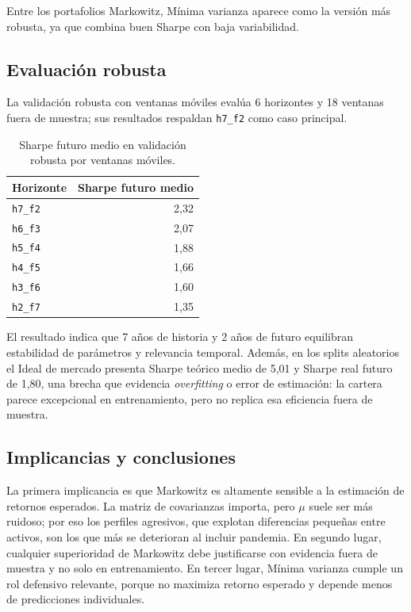 Entre los portafolios Markowitz, M\'inima varianza aparece como la versi\'on m\'as
robusta, ya que combina buen Sharpe con baja variabilidad.

\subsection*{Evaluaci\'on robusta}

La validaci\'on robusta con ventanas m\'oviles eval\'ua 6 horizontes y 18 ventanas
fuera de muestra; sus resultados respaldan \texttt{h7\_f2} como caso principal.

\begin{table}[H]
\centering
\caption{Sharpe futuro medio en validaci\'on robusta por ventanas m\'oviles.}
\label{tab:anexo4_validacion_robusta}
\small
\begin{tabular}{@{}lr@{}}
\toprule
Horizonte & Sharpe futuro medio \\
\midrule
\texttt{h7\_f2} & 2,32 \\
\texttt{h6\_f3} & 2,07 \\
\texttt{h5\_f4} & 1,88 \\
\texttt{h4\_f5} & 1,66 \\
\texttt{h3\_f6} & 1,60 \\
\texttt{h2\_f7} & 1,35 \\
\bottomrule
\end{tabular}
\end{table}

El resultado indica que 7 a\~nos de historia y 2 a\~nos de futuro equilibran
estabilidad de par\'ametros y relevancia temporal. Adem\'as, en los splits
aleatorios el Ideal de mercado presenta Sharpe te\'orico medio de 5,01 y Sharpe
real futuro de 1,80, una brecha que evidencia \textit{overfitting} o error de
estimaci\'on: la cartera parece excepcional en entrenamiento, pero no replica esa
eficiencia fuera de muestra.

\subsection*{Implicancias y conclusiones}

La primera implicancia es que Markowitz es altamente sensible a la estimaci\'on
de retornos esperados. La matriz de covarianzas importa, pero $\mu$ suele ser
m\'as ruidoso; por eso los perfiles agresivos, que explotan diferencias
peque\~nas entre activos, son los que m\'as se deterioran al incluir pandemia. En
segundo lugar, cualquier superioridad de Markowitz debe justificarse con
evidencia fuera de muestra y no solo en entrenamiento. En tercer lugar,
M\'inima varianza cumple un rol defensivo relevante, porque no maximiza retorno
esperado y depende menos de predicciones individuales.

